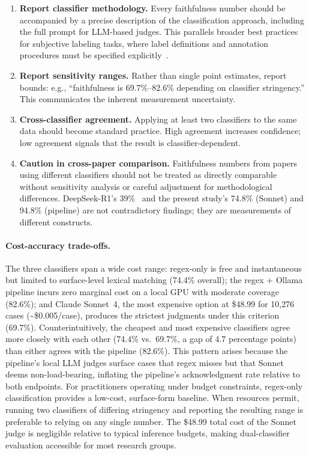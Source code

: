 \begin{enumerate}
    \item \textbf{Report classifier methodology.} Every faithfulness number should be accompanied by a precise description of the classification approach, including the full prompt for LLM-based judges. This parallels broader best practices for subjective labeling tasks, where label definitions and annotation procedures must be specified explicitly~\cite{plank2022problem, gordon2021disagreement}.
    \item \textbf{Report sensitivity ranges.} Rather than single point estimates, report bounds: e.g., ``faithfulness is 69.7\%--82.6\% depending on classifier stringency.'' This communicates the inherent measurement uncertainty.
    \item \textbf{Cross-classifier agreement.} Applying at least two classifiers to the same data should become standard practice. High agreement increases confidence; low agreement signals that the result is classifier-dependent.
    \item \textbf{Caution in cross-paper comparison.} Faithfulness numbers from papers using different classifiers should not be treated as directly comparable without sensitivity analysis or careful adjustment for methodological differences. DeepSeek-R1's 39\%~\cite{chen2025reasoning} and the present study's 74.8\% (Sonnet) and 94.8\% (pipeline) are not contradictory findings; they are measurements of different constructs.
\end{enumerate}

\paragraph{Cost-accuracy trade-offs.} The three classifiers span a wide cost range: regex-only is free and instantaneous but limited to surface-level lexical matching (74.4\% overall); the regex + Ollama pipeline incurs zero marginal cost on a local GPU with moderate coverage (82.6\%); and Claude Sonnet~4, the most expensive option at \$48.99 for 10,276 cases (\textasciitilde\$0.005/case), produces the strictest judgments under this criterion (69.7\%). Counterintuitively, the cheapest and most expensive classifiers agree more closely with each other (74.4\% vs.\ 69.7\%, a gap of 4.7 percentage points) than either agrees with the pipeline (82.6\%). This pattern arises because the pipeline's local LLM judges surface cases that regex misses but that Sonnet deems non-load-bearing, inflating the pipeline's acknowledgment rate relative to both endpoints. For practitioners operating under budget constraints, regex-only classification provides a low-cost, surface-form baseline. When resources permit, running two classifiers of differing stringency and reporting the resulting range is preferable to relying on any single number. The \$48.99 total cost of the Sonnet judge is negligible relative to typical inference budgets, making dual-classifier evaluation accessible for most research groups.

